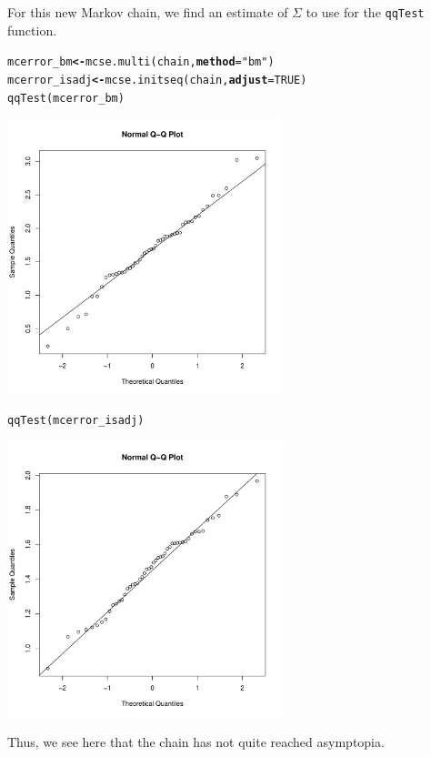\documentclass[11pt]{article}\usepackage[]{graphicx}\usepackage[]{color}
\makeatletter
\newcommand{\hlnum}[1]{\textcolor[rgb]{1,0.078,0.576}{#1}}%
\newcommand{\hlstr}[1]{\textcolor[rgb]{1,0.078,0.576}{#1}}%
\newcommand{\hlstd}[1]{\textcolor[rgb]{0,0,0}{#1}}%
\newcommand{\hlkwb}[1]{\textcolor[rgb]{0.18,0.545,0.341}{\textbf{#1}}}%
\newcommand{\hlkwc}[1]{\textcolor[rgb]{0.412,0.412,0.412}{\textbf{#1}}}%
\newcommand{\hlkwd}[1]{\textcolor[rgb]{0,0,0.561}{#1}}%
\newenvironment{kframe}{%
 \def\at@end@of@kframe{}%
 \ifinner\ifhmode%
  \def\at@end@of@kframe{\end{minipage}}%
  \begin{minipage}{\columnwidth}%
 \fi\fi%
 \def\FrameCommand##1{\hskip\@totalleftmargin \hskip-\fboxsep
 \colorbox{shadecolor}{##1}\hskip-\fboxsep
     \hskip-\linewidth \hskip-\@totalleftmargin \hskip\columnwidth}%
 \MakeFramed {\advance\hsize-\width
   \@totalleftmargin\z@ \linewidth\hsize
   \@setminipage}}%
 {\par\unskip\endMakeFramed%
 \at@end@of@kframe}
\newenvironment{knitrout}{}{} %
\makeatother
\begin{document}
For this new Markov chain, we find an estimate of $\Sigma$ to use for the \texttt{qqTest} function.

\begin{knitrout}
\color{fgcolor}\begin{kframe}
\begin{alltt}
\hlstd{mcerror_bm} \hlkwb{<-} \hlkwd{mcse.multi}\hlstd{(chain,} \hlkwc{method} \hlstd{=} \hlstr{"bm"}\hlstd{)}
\hlstd{mcerror_isadj} \hlkwb{<-} \hlkwd{mcse.initseq}\hlstd{(chain,} \hlkwc{adjust} \hlstd{=} \hlnum{TRUE}\hlstd{)}
\hlkwd{qqTest}\hlstd{(mcerror_bm)}
\end{alltt}
\end{kframe}
\includegraphics[width=8cm]{figure/qq-1} 
\begin{kframe}\begin{alltt}
\hlkwd{qqTest}\hlstd{(mcerror_isadj)}
\end{alltt}
\end{kframe}
\includegraphics[width=8cm]{figure/qq-2} 

\end{knitrout}

Thus, we see here that the chain has not quite reached asymptopia.


\end{document}
